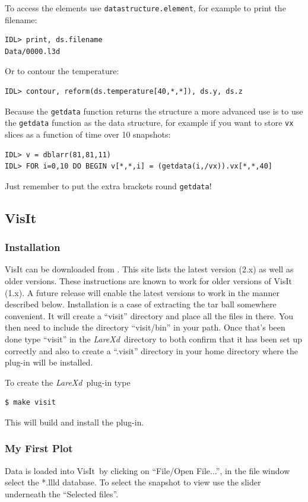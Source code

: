 \documentclass[11pt]{article}
\newcommand{\lare}{{\it LareXd}\ }
\newcommand{\visit}{VisIt\ }
\begin{document}
To access the elements use \texttt{datastructure.element}, for example to print the filename:
\begin{verbatim}
IDL> print, ds.filename
Data/0000.l3d
\end{verbatim}

Or to contour the temperature:
\begin{verbatim}
IDL> contour, reform(ds.temperature[40,*,*]), ds.y, ds.z
\end{verbatim}

Because the \texttt{getdata} function returns the structure a more advanced use is to use the \texttt{getdata} function as the data structure, for example if you want to store \texttt{vx} slices as a function of time over 10 snapshots:
\begin{verbatim}
IDL> v = dblarr(81,81,11)
IDL> FOR i=0,10 DO BEGIN v[*,*,i] = (getdata(i,/vx)).vx[*,*,40]
\end{verbatim}
Just remember to put the extra brackets round \texttt{getdata}!

\subsection{VisIt}
\subsubsection{Installation}
VisIt can be downloaded from \cite{visit}. This site lists the latest version (2.x) as well as older versions. These instructions are known to work for older versions of VisIt (1.x). A future release will enable the latest versions to work in the manner described below. Installation is a case of extracting the tar ball somewhere convenient. It will create a ``visit'' directory and place all the files in there. You then need to include the directory ``visit/bin'' in your path. Once that's been done type ``visit'' in the \lare directory to both confirm that it has been set up correctly and also to create a ``.visit'' directory in your home directory where the plug-in will be installed.

To create the \lare plug-in type
\begin{verbatim}
$ make visit
\end{verbatim}

This will build and install the plug-in.

\subsubsection{My First Plot}
Data is loaded into \visit by clicking on ``File/Open File...'', in the file window select the *.llld database. To select the snapshot to view use the slider underneath the ``Selected files''. 
\end{document}
